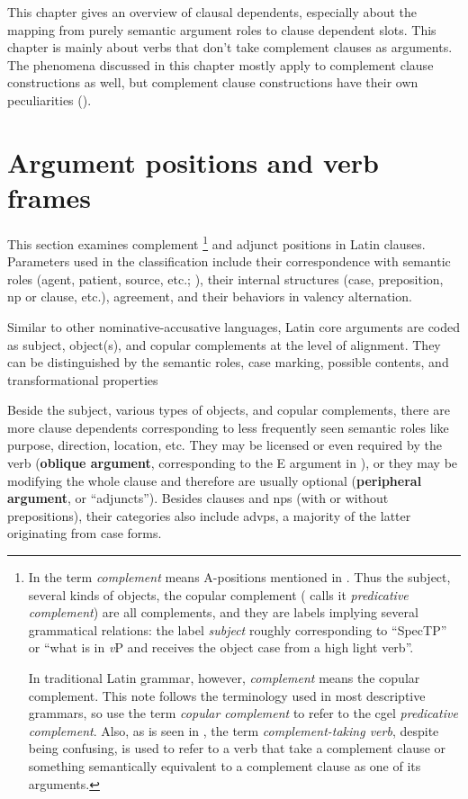 \documentclass[a4paper, oneside, 12pt]{report}
\newcommand*{\citesec}[1]{\S~{#1}}
\newcommand*{\citepage}[1]{p.~{#1}}
\newcommand*{\concept}[1]{\textbf{#1}}
\newcommand*{\term}[1]{\emph{#1}}
\newcommand{\vP}{\textit{v}P}
\begin{document}
This chapter gives an overview of clausal dependents,
especially about the mapping from purely semantic argument roles to clause dependent slots.
This chapter is mainly about verbs that don't take complement clauses as arguments.
The phenomena discussed in this chapter mostly apply to complement clause constructions as well,
but complement clause constructions have their own peculiarities 
().


\section{Argument positions and verb frames}\label{sec:core-argument-marking}

This section examines complement%
\footnote{
    In \citet{cgel} the term \term{complement} 
    means A-positions mentioned in .
    Thus the subject, several kinds of objects,
    the copular complement (\cite{cgel} calls it \term{predicative complement}) are all complements,
    and they are labels implying several grammatical relations:
    the label \term{subject} roughly corresponding to ``SpecTP'' or ``what is in \vP{} 
    and receives the object case from a high light verb''.

    In traditional Latin grammar, however, \term{complement} means the copular complement. 
    This note follows the terminology used in most descriptive grammars,
    so use the term \term{copular complement} to refer to the \ac{cgel} \term{predicative complement}.
    Also, as is seen in , 
    the term \term{complement-taking verb}, despite being confusing,
    is used to refer to a verb that take a complement clause 
    or something semantically equivalent to a complement clause
    as one of its arguments.
}
and adjunct positions in Latin clauses. 
Parameters used in the classification include 
their correspondence with semantic roles 
(agent, patient, source, etc.; 
\citealt[\citesec{4.2}]{cgel}),
their internal structures (case, preposition, \acs{np} or clause, etc.), 
agreement, and
their behaviors in valency alternation.

Similar to other nominative-accusative languages,
Latin core arguments are coded as subject, object(s),
and copular complements at the level of alignment.
They can be distinguished by the semantic roles,
case marking, possible contents, and transformational properties

Beside the subject, various types of objects, and copular complements,
there are more clause dependents
corresponding to less frequently seen semantic roles 
like purpose, direction, location, etc.
They may be licensed or even required by the verb 
(\concept{oblique argument}, 
corresponding to the E argument in \citet[\citepage{116}]{dixon2010basic2}),
or they may be modifying the whole clause and therefore are usually optional 
(\concept{peripheral argument}, or ``adjuncts'').
Besides clauses and \ac{np}s (with or without prepositions),
their categories also include \ac{advp}s,
a majority of the latter originating from case forms.
\end{document}
